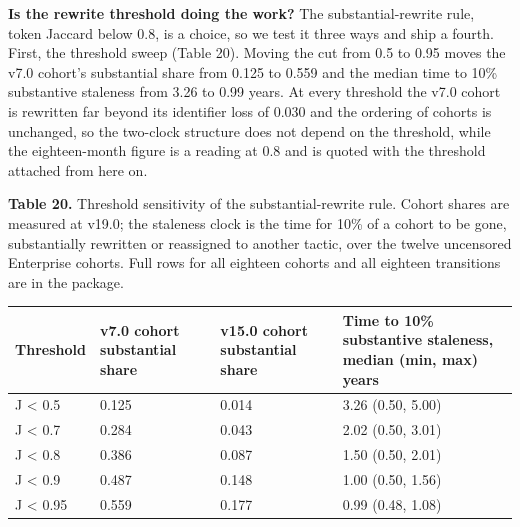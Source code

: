\documentclass[11pt,a4paper]{article}
\begin{document}
\textbf{Is the rewrite threshold doing the work?} The substantial-rewrite rule, token Jaccard below 0.8, is a choice, so we test it three ways and ship a fourth. First, the threshold sweep (Table 20). Moving the cut from 0.5 to 0.95 moves the v7.0 cohort's substantial share from 0.125 to 0.559 and the median time to 10\% substantive staleness from 3.26 to 0.99 years. At every threshold the v7.0 cohort is rewritten far beyond its identifier loss of 0.030 and the ordering of cohorts is unchanged, so the two-clock structure does not depend on the threshold, while the eighteen-month figure is a reading at 0.8 and is quoted with the threshold attached from here on.

\textbf{Table 20.} Threshold sensitivity of the substantial-rewrite rule. Cohort shares are measured at v19.0; the staleness clock is the time for 10\% of a cohort to be gone, substantially rewritten or reassigned to another tactic, over the twelve uncensored Enterprise cohorts. Full rows for all eighteen cohorts and all eighteen transitions are in the package.

\begin{center}\footnotesize
\begin{tabular}{llll}
\toprule
Threshold & v7.0 cohort substantial share & v15.0 cohort substantial share & Time to 10\% substantive staleness, median (min, max) years \\
\midrule
J < 0.5 & 0.125 & 0.014 & 3.26 (0.50, 5.00) \\
J < 0.7 & 0.284 & 0.043 & 2.02 (0.50, 3.01) \\
J < 0.8 & 0.386 & 0.087 & 1.50 (0.50, 2.01) \\
J < 0.9 & 0.487 & 0.148 & 1.00 (0.50, 1.56) \\
J < 0.95 & 0.559 & 0.177 & 0.99 (0.48, 1.08) \\
\bottomrule
\end{tabular}
\end{center}
\end{document}
